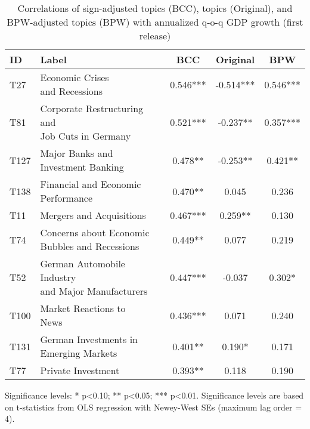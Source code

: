 \begin{table}[h!]
  \centering
  \caption{Correlations of sign-adjusted topics (BCC), topics (Original), and BPW-adjusted topics (BPW) with annualized q-o-q GDP growth (first release)}
  \label{tab:cor_gdp_different_approaches_sig}
  \begin{threeparttable}
    \footnotesize
    \renewcommand{\arraystretch}{1.3}

\begin{tabular}{llccc}
\toprule
ID & Label & BCC & Original & BPW\\
\midrule
T27 & \makecell[tl]{ Economic Crises \\ and Recessions} & 0.546*** & -0.514*** & 0.546***\\
T81 & \makecell[tl]{ Corporate Restructuring and \\ Job Cuts in Germany} & 0.521*** & -0.237** & 0.357***\\
T127 & \makecell[tl]{ Major Banks and \\ Investment Banking} & 0.478** & -0.253** & 0.421**\\
T138 & \makecell[tl]{ Financial and Economic \\ Performance} & 0.470** & 0.045 & 0.236\\
T11 & Mergers and Acquisitions & 0.467*** & 0.259** & 0.130\\
\addlinespace
T74 & \makecell[tl]{ Concerns about Economic\\ Bubbles and Recessions} & 0.449** & 0.077 & 0.219\\
T52 & \makecell[tl]{ German Automobile Industry \\ and Major Manufacturers} & 0.447*** & -0.037 & 0.302*\\
T100 & \makecell[tl]{ Market Reactions to \\News} & 0.436*** & 0.071 & 0.240\\
T131 & \makecell[tl]{German Investments in \\ Emerging Markets} & 0.401** & 0.190* & 0.171\\
T77 & Private Investment & 0.393** & 0.118 & 0.190\\
\bottomrule
\end{tabular}

    \begin{tablenotes}[flushleft]
      \small
      \item Significance levels: * p<0.10; ** p<0.05; *** p<0.01. Significance levels are based on t-statistics from OLS regression with Newey-West SEs (maximum lag order = 4).
    \end{tablenotes}
  \end{threeparttable}
\end{table}

